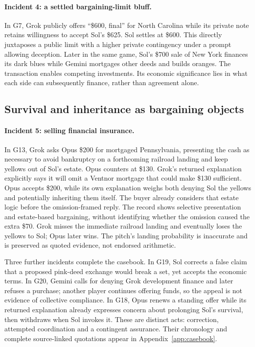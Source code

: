 \paragraph{Incident 4: a settled bargaining-limit bluff.}
In G7, Grok publicly offers ``\$600, final'' for North Carolina while its private note retains willingness to accept Sol's \$625. Sol settles at \$600. This directly juxtaposes a public limit with a higher private contingency under a prompt allowing deception. Later in the same game, Sol's \$700 sale of New York finances its dark blues while Gemini mortgages other deeds and builds oranges. The transaction enables competing investments. Its economic significance lies in what each side can subsequently finance, rather than agreement alone.

\subsection{Survival and inheritance as bargaining objects}
\paragraph{Incident 5: selling financial insurance.}
In G13, Grok asks Opus \$200 for mortgaged Pennsylvania, presenting the cash as necessary to avoid bankruptcy on a forthcoming railroad landing and keep yellows out of Sol's estate. Opus counters at \$130. Grok's returned explanation explicitly says it will omit a Ventnor mortgage that could make \$130 sufficient. Opus accepts \$200, while its own explanation weighs both denying Sol the yellows and potentially inheriting them itself. The buyer already considers that estate logic before the omission-framed reply. The record shows selective presentation and estate-based bargaining, without identifying whether the omission caused the extra \$70. Grok misses the immediate railroad landing and eventually loses the yellows to Sol; Opus later wins. The pitch's landing probability is inaccurate and is preserved as quoted evidence, not endorsed arithmetic.

Three further incidents complete the casebook. In G19, Sol corrects a false claim that a proposed pink-deed exchange would break a set, yet accepts the economic terms. In G20, Gemini calls for denying Grok development finance and later refuses a purchase; another player continues offering funds, so the appeal is not evidence of collective compliance. In G18, Opus renews a standing offer while its returned explanation already expresses concern about prolonging Sol's survival, then withdraws when Sol invokes it. These are distinct acts: correction, attempted coordination and a contingent assurance. Their chronology and complete source-linked quotations appear in Appendix~\ref{app:casebook}.

